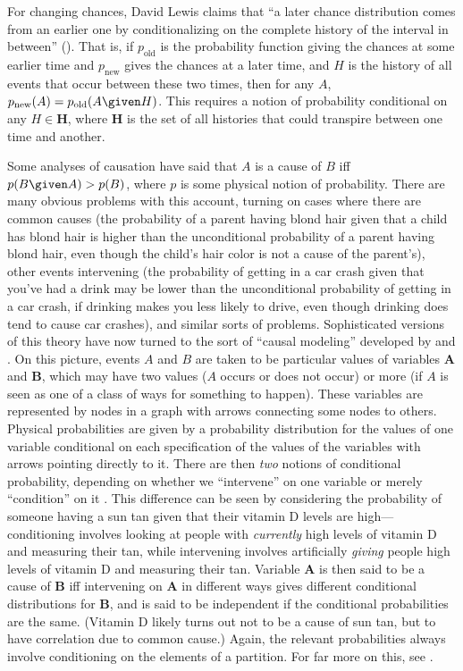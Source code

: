 For changing chances, David Lewis claims that ``a later chance distribution comes from an earlier one by conditionalizing on the complete history of the interval in between'' (\citeyear[p.\ 280]{objchance}). That is, if $p_{\text{old}}$ is the probability function giving the chances at some earlier time and $p_{\text{new}}$ gives the chances at a later time, and $H$ is the history of all events that occur between these two times, then for any $A$, $p_{\text{new}}(A)=p_{\text{old}}(A \given H)$. This requires a notion of probability conditional on any $H\in\mathbf{H}$, where $\mathbf{H}$ is the set of all histories that could transpire between one time and another.

Some analyses of causation have said that $A$ is a cause of $B$ iff $p(B \given A)>p(B)$, where $p$ is some physical notion of probability. There are many obvious problems with this account, turning on cases where there are common causes (the probability of a parent having blond hair given that a child has blond hair is higher than the unconditional probability of a parent having blond hair, even though the child's hair color is not a cause of the parent's), other events intervening (the probability of getting in a car crash given that you've had a drink may be lower than the unconditional probability of getting in a car crash, if drinking makes you less likely to drive, even though drinking does tend to cause car crashes), and similar sorts of problems. Sophisticated versions of this theory have now turned to the sort of ``causal modeling'' developed by \citet{pearl2000} and \citet{sgs}. On this picture, events $A$ and $B$ are taken to be particular values of variables $\mathbf{A}$ and $\mathbf{B}$, which may have two values ($A$ occurs or does not occur) or more (if $A$ is seen as one of a class of ways for something to happen). These variables are represented by nodes in a graph with arrows connecting some nodes to others. Physical probabilities are given by a probability distribution for the values of one variable conditional on each specification of the values of the variables with arrows pointing directly to it. There are then \emph{two} notions of conditional probability, depending on whether we ``intervene'' on one variable or merely ``condition'' on it \citep{intervening}. This difference can be seen by considering the probability of someone having a sun tan given that their vitamin D levels are high---conditioning involves looking at people with \emph{currently} high levels of vitamin D and measuring their tan, while intervening involves artificially \emph{giving} people high levels of vitamin D and measuring their tan. Variable $\mathbf{A}$ is then said to be a cause of $\mathbf{B}$ iff intervening on $\mathbf{A}$ in different ways gives different conditional distributions for $\mathbf{B}$, and is said to be independent if the conditional probabilities are the same. (Vitamin D likely turns out not to be a cause of sun tan, but to have correlation due to common cause.) Again, the relevant probabilities always involve conditioning on the elements of a partition. For far more on this, see \citet{probcause}.

